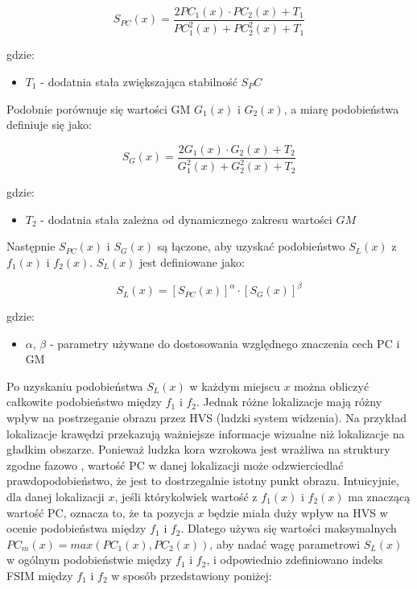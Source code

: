 \documentclass{article}
\begin{document}
\begin{equation}
  S_{PC}(x) = \frac{2PC_1(x) \cdot PC_2(x) + T_1}{PC^2_1(x) + PC^2_2(x) + T_1}
\end{equation}

gdzie:
\begin{itemize}[label=]
  \item $T_1$ - dodatnia stała zwiększająca stabilność $S_PC$
\end{itemize}

Podobnie porównuje się wartości GM $G_1(x)$ i $G_2(x)$, a miarę podobieństwa definiuje się jako:

\begin{equation}
  S_G(x) = \frac{2G_1(x) \cdot G_2(x) + T_2}{G^2_1(x) + G^2_2(x) + T_2}
\end{equation}

gdzie:
\begin{itemize}[label=]
  \item $T_2$ - dodatnia stała zależna od dynamicznego zakresu wartości $GM$
\end{itemize}

Następnie $S_{PC}(x)$ i $S_G(x)$ są łączone, aby uzyskać podobieństwo $S_L(x)$ z $f_1(x)$ i $f_2(x)$. $S_L(x)$ jest definiowane jako:

\begin{equation}
  S_L(x) = [S_{PC}(x)]^\alpha \cdot [S_G(x)]^\beta
\end{equation}

gdzie:
\begin{itemize}[label=]
  \item $\alpha$, $\beta$ - parametry używane do dostosowania względnego znaczenia cech PC i GM
\end{itemize}

Po uzyskaniu podobieństwa $S_L(x)$ w każdym miejscu $x$ można obliczyć całkowite podobieństwo między $f_1$ i $f_2$. 
Jednak różne lokalizacje mają różny wpływ na postrzeganie obrazu przez HVS (ludzki system widzenia). 
Na przykład lokalizacje krawędzi przekazują ważniejsze informacje wizualne niż lokalizacje na gładkim obszarze. 
Ponieważ ludzka kora wzrokowa jest wrażliwa na struktury zgodne fazowo \cite{kora_wzrokowa}, wartość PC w danej 
lokalizacji może odzwierciedlać prawdopodobieństwo, że jest to dostrzegalnie istotny punkt obrazu. 
Intuicyjnie, dla danej lokalizacji $x$, jeśli którykolwiek wartość z $f_1(x)$ i $f_2(x)$ ma znaczącą wartość PC, 
oznacza to, że ta pozycja $x$ będzie miała duży wpływ na HVS w ocenie podobieństwa między $f_1$ i $f_2$. 
Dlatego używa się wartości maksymalnych $PC_m(x) = max (PC_1(x), PC_2(x))$, aby nadać wagę parametrowi $S_L(x)$ w 
ogólnym podobieństwie między $f_1$ i $f_2$, i odpowiednio zdefiniowano indeks FSIM między $f_1$ i $f_2$ w sposób przedstawiony poniżej:
\end{document}
